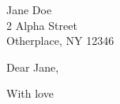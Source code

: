 \documentclass[paper=letter]{scrletter}
\begin{document}
\begin{letter}{Jane Doe\\2 Alpha Street\\Otherplace, NY 12346}
\opening{Dear Jane,}
\blindtext
\closing{With love}
\end{letter}
\end{document}
